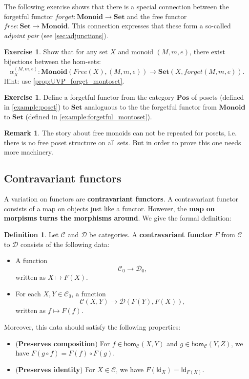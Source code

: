 \documentclass[a4paper,10pt]{scrartcl}
\theoremstyle{plain}
\theoremstyle{definition}
\newtheorem{rem}[thm]{Remark}
\newtheorem{dfn}[thm]{Definition}
\newtheorem{exer}[thm]{Exercise}
\newcommand{\cfont}[1]{\ensuremath{\mathsf{#1}}}
\newcommand{\Cat}[1]{\mathcal{#1}}
\newcommand{\CC}{\Cat{C}}
\newcommand{\DD}{\Cat{D}}
\newcommand{\Catb}[1]{\mathbf{#1}}
\newcommand{\SET}{\Catb{Set}}
\newcommand{\POS}{\Catb{Pos}}
\newcommand{\MON}{\Catb{Monoid}}
\newcommand{\Ob}[1]{{#1}_0}
\newcommand{\Hom}[3][]{\cfont{hom}_{#1}(#2,#3)}
\newcommand{\CHom}[3]{{#1}(#2,#3)}
\newcommand{\Id}[1][]{\cfont{Id}_{#1}}
\newcommand{\co}[2]{\ensuremath{#2 \circ #1}}
\begin{document}
The following exercise shows that there is a special connection between the forgetful functor $\mathit{forget}: \MON\to\SET$ and the free functor $\mathit{free}: \SET\to\MON$. This connection expresses that these form a so-called \textit{adjoint pair} (see \cref{sec:adjunctions}).
\begin{exer}\label{exer:preadjunction_monset}
Show that for any set $X$ and monoid $(M,m,e)$, there exist bijections between the hom-sets:
\[
\alpha_{X}^{(M,m,e)} : \CHom{\MON}{Free(X)}{(M,m,e)} \to \CHom{\SET}{X}{forget(M,m,e)}.
\]
Hint: use \cref{prop:UVP_forget_montoset}.
\end{exer}

\begin{exer} Define a forgetful functor from the category $\POS$ of posets (defined in \cref{example:poset}) to $\SET$ analoguous to the the forgetful functor from $\MON$ to $\SET$ (defined in \cref{example:forgetful_montoset}).
\end{exer}
\begin{rem} The story about free monoids can not be repeated for posets, i.e. there is no free poset structure on all sets. But in order to prove this one needs more machinery.
\end{rem}


\subsection{Contravariant functors}

A variation on functors are \textbf{contravariant functors}.
A contravariant functor consists of a map on objects just like a functor.
However, the \textbf{map on morpisms turns the morphisms around}.
We give the formal definition:

\begin{dfn} Let $\CC$ and $\DD$ be categories. A \textbf{contravariant functor} $F$ from $\CC$ to $\DD$ consists of the following data:
\begin{itemize}
\item A function 
\[
\Ob{\CC} \to \Ob{\DD},
\]
written as $X\mapsto F(X)$.
\item For each $X,Y\in \Ob{\CC}$, a function
\[
\CHom{\CC}{X}{Y} \to \CHom{\DD}{F(Y)}{F(X)},
\]
written as $f\mapsto F(f)$.
\end{itemize}
Moreover, this data should satisfy the following properties:
\begin{itemize}
\item (\textbf{Preserves composition}) For $f\in \Hom[\CC]{X}{Y}$ and $g\in \Hom[\CC]{Y}{Z}$, we have $F(\co f g) =  \co {F(g)}{F(f)}$.
\item (\textbf{Preserves identity}) For $X\in\CC$, we have $F(\Id[X]) = \Id[F(X)]$.
\end{itemize}
\end{dfn}
\end{document}
